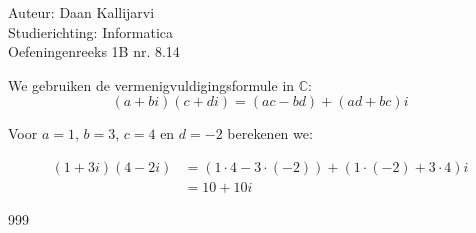 \documentclass[a4paper]{article}
\begin{document}
\noindent \large Auteur: Daan Kallijarvi\\
\noindent \large Studierichting: Informatica\\
\noindent \large Oefeningenreeks 1B nr. 8.14

\medskip
\normalsize

We gebruiken de vermenigvuldigingsformule in $\mathbb{C}$:
\[
(a + bi)(c + di) = (ac - bd) + (ad + bc)i
\]

Voor $a = 1$, $b = 3$, $c = 4$ en $d = -2$ berekenen we:

\begin{align*}
(1 + 3i)(4 - 2i) 
&= (1 \cdot 4 - 3 \cdot (-2)) + (1 \cdot (-2) + 3 \cdot 4)i \\
&= 10 + 10i
\end{align*}

\begin{thebibliography}{999}
\end{thebibliography}
\end{document}
